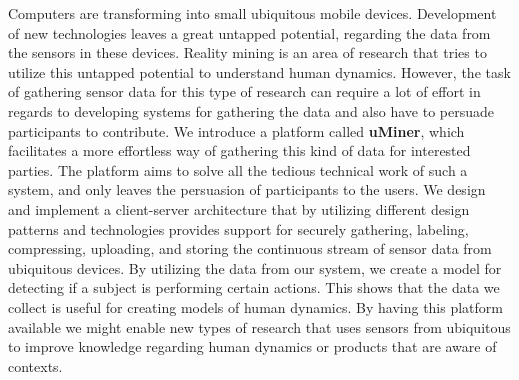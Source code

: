 
Computers are transforming into small ubiquitous mobile devices. Development of new technologies leaves a great untapped potential, regarding the data from the sensors in these devices. 
Reality mining is an area of research that tries to utilize this untapped potential to understand human dynamics. However, the task of gathering sensor data for this type of research can require a lot of effort in regards to developing systems for gathering the data and also have to persuade participants to contribute.
We introduce a platform called \textbf{uMiner}, which facilitates a more effortless way of gathering this kind of data for interested parties. The platform aims to solve all the tedious technical work of such a system, and only leaves the persuasion of participants to the users.
We design and implement a client-server architecture that by utilizing different design patterns and technologies provides support for securely gathering, labeling, compressing, uploading, and storing the continuous stream of sensor data from ubiquitous devices. 
By utilizing the data from our system, we create a model for detecting if a subject is performing certain actions. This shows that the data we collect is useful for creating models of human dynamics.  
By having this platform available we might enable new types of research that uses sensors from ubiquitous to improve knowledge regarding human dynamics or products that are aware of contexts.